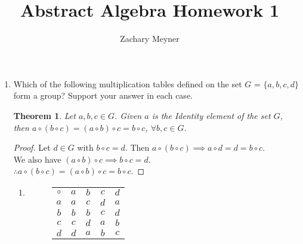 \documentclass[12pt]{article}
\title{\large Abstract Algebra Homework 1}
\author{\large Zachary Meyner}
\date{}
\newlength{\strutheight}
\newtheorem{theorem}{Theorem}
\newcommand\setitemnumber[1]{\setcounter{enumi}{\numexpr#1-1\relax}}
\begin{document}
\maketitle
\begin{enumerate}[label=\textbf{\arabic*}.]
  \setitemnumber{2}
    \item Which of the following multiplication tables defined on the set $G$ = $\{a,b,c,d\}$ form a
          group? Support your answer in each case.
    \begin{theorem}
        Let $a,b,c \in G$. Given $a$ is the Identity element of the set $G$, \\
        then \(a \circ (b \circ c) = (a \circ b) \circ c = b \circ c\), \(\forall b,c \in G\).
    \end{theorem}
    \begin{proof}
        Let $d \in G$ with $b \circ c = d$. Then \(a \circ (b \circ c) \implies a \circ d = d = b \circ c\). \\
        We also have \((a \circ b) \circ c \implies b \circ c = d\). \\
        \(\therefore a \circ (b \circ c) = (a \circ b) \circ c = b \circ c\).
    \end{proof}
    \begin{enumerate}
        \item \begin{adjustbox}{valign=T,raise=\strutheight,minipage={1.0\linewidth}}
              \begin{wrapfigure}{l}{0pt}
              \begin{tabular}{c|cccc}
              $\circ$ & $a$ & $b$ & $c$ & $d$ \\
              \cline{1-5}
              $a$       & $a$ & $c$ & $d$ & $a$ \\
              $b$       & $b$ & $b$ & $c$ & $d$ \\
              $c$       & $c$ & $d$ & $a$ & $b$ \\
              $d$       & $d$ & $a$ & $b$ & $c$ \\


\end{tabular}
\end{wrapfigure}
\end{adjustbox}
\end{enumerate}
\end{enumerate}
\end{document}
